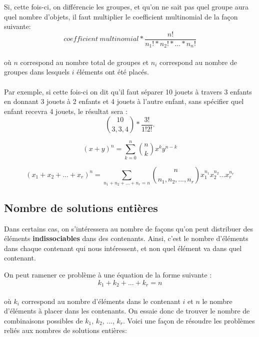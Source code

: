 \documentclass[10pt, french]{article}
\begin{document}
\begin{multicols*}{2}
\begin{definitionNOHFILL}
Si, cette fois-ci, on différencie les groupes, et qu'on ne sait pas quel groupe aura quel nombre d'objets, il faut multiplier le coefficient multinomial de la façon suivante: 
$$ coefficient\ multinomial * \frac{n!}{n_1!*n_2!* ... *n_n!}$$\\ où $n$ correspond au nombre total de groupes et $n_i$ correspond au nombre de groupes dans lesquels $i$ éléments ont été placés. \\
\\
Par exemple, si cette fois-ci on dit qu'il faut séparer 10 jouets à travers 3 enfants en donnant 3 jouets à 2 enfants et 4 jouets à l'autre enfant, sans spécifier quel enfant recevra 4 jouets, le résultat sera :\\ $$ \binom{10}{3, 3, 4} * \frac{3!}{1!2!}.$$
\end{definitionNOHFILL}

\begin{definitionNOHFILLprop}
$$(x + y)^ n = \sum_{k=0}^{n} \binom{n}{k} x^k y^{n-k}$$
\end{definitionNOHFILLprop}

\begin{definitionNOHFILLprop}
$$(x_1 + x_2 + ... + x_r)^n = \sum_{n_1 + n_2 + ... + n_r = n} \binom{n}{n_1, n_2, ..., n_r}x_1^{n_1} x_2^{n_2} ... x_r^{n_r}$$ 
\end{definitionNOHFILLprop}

\subsection{Nombre de solutions entières}
\begin{definitionNOHFILLsub} Dans certains cas, on s'intéressera au nombre de façons qu'on peut distribuer des éléments \textbf{indissociables} dans des contenants. Ainsi, c'est le nombre d'éléments dans chaque contenant qui nous intéressent, et non quel élément va dans quel contenant. 
\end{definitionNOHFILLsub}
\begin{definitionNOHFILLsub}
On peut ramener ce problème à une équation de la forme suivante :\\ $$k_1+k_2+ ... +k_r = n$$\\ où $k_i$ correspond au nombre d'éléments dans le contenant $i$ et $n$ le nombre d'éléments à placer dans les contenants. On essaie donc de trouver le nombre de combinaisons possibles de $k_1$, $k_2$, ..., $k_r$. Voici une façon de résoudre les problèmes reliés aux nombres de solutions entières:


\end{definitionNOHFILLsub}
\end{multicols*}
\end{document}
